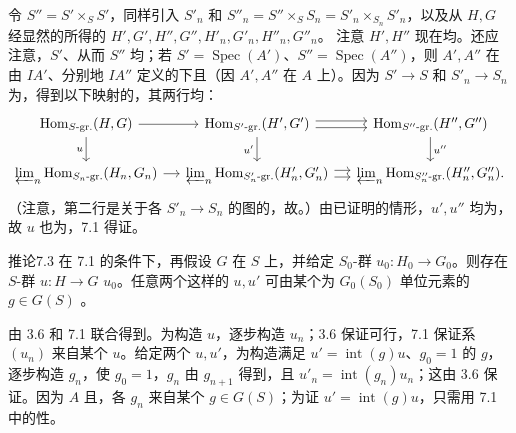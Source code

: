 令 $S''=S'\times_S S'$，同样引入 $S'_n$ 和 $S''_n=S''\times_S S_n=S'_n\times_{S_n}S'_n$，以及从 $H,G$ 经显然的所得的 $H',G',H'',G'',H'_n,G'_n,H''_n,G''_n$。
注意 $H',H''$ 现在均。还应注意，$S'$、从而 $S''$ 均；若 $S'=\operatorname{Spec}(A')$、$S''=\operatorname{Spec}(A'')$，则 $A',A''$ 在由 $IA'$、分别地 $IA''$ 定义的下且（因 $A',A''$ 在 $A$ 上）。因为 $S'\to S$ 和 $S'_n\to S_n$ 为，得到以下映射的，其两行均：
\[
\begin{tikzcd}[column sep=small]
\operatorname{Hom}_{S\text{-gr.}}(H,G)\arrow[r]\arrow[d,"u"']&\operatorname{Hom}_{S'\text{-gr.}}(H',G')\arrow[r,shift left]\arrow[r,shift right]\arrow[d,"u'"']&\operatorname{Hom}_{S''\text{-gr.}}(H'',G'')\arrow[d,"u''"]\\
\varprojlim_n\operatorname{Hom}_{S_n\text{-gr.}}(H_n,G_n)\arrow[r]&\varprojlim_n\operatorname{Hom}_{S'_n\text{-gr.}}(H'_n,G'_n)\arrow[r,shift left]\arrow[r,shift right]&\varprojlim_n\operatorname{Hom}_{S''_n\text{-gr.}}(H''_n,G''_n).
\end{tikzcd}
\]
（注意，第二行是关于各 $S'_n\to S_n$ 的图的，故。）由已证明的情形，$u',u''$ 均为，故 $u$ 也为，7.1 得证。
\begin{SGAresult}{推论}{7.3}
在 7.1 的条件下，再假设 $G$ 在 $S$ 上，并给定 $S_0$-群 $u_0:H_0\to G_0$。则存在 $S$-群 $u:H\to G$  $u_0$。任意两个这样的 $u,u'$ 可由某个为 $G_0(S_0)$ 单位元素的 $g\in G(S)$ 。
\end{SGAresult}
由 3.6 和 7.1 联合得到。为构造 $u$，逐步构造 $u_n$；3.6 保证可行，7.1 保证系 $(u_n)$ 来自某个 $u$。给定两个 $u,u'$，为构造满足 $u'=\operatorname{int}(g)u$、$g_0=1$ 的 $g$，逐步构造 $g_n$，使 $g_0=1$，$g_n$ 由 $g_{n+1}$ 得到，且 $u'_n=\operatorname{int}(g_n)u_n$；这由 3.6 保证。因为 $A$ 且，各 $g_n$ 来自某个 $g\in G(S)$；为证 $u'=\operatorname{int}(g)u$，只需用 7.1 中的性。

